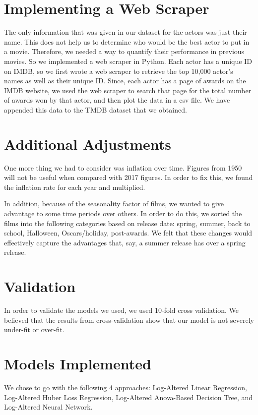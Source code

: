 \documentclass{article}
\begin{document}
\section*{Implementing a Web Scraper}
\vspace{0.2in}

The only information that was given in our dataset for the actors was just their name. This does not help us to determine who would be the best actor to put in a movie. Therefore, we needed a way to quantify their performance in previous movies. So we implemented a web scraper in Python. Each actor has a unique ID on IMDB, so we first wrote a web scraper to retrieve the top 10,000 actor’s names as well as their unique ID. Since, each actor has a page of awards on the IMDB website, we used the web scraper to search that page for the total number of awards won by that actor, and then plot the data in a csv file. We have appended this data to the TMDB dataset that we obtained. 

\section*{Additional Adjustments}
\vspace{0.2in}

One more thing we had to consider was inflation over time. Figures from 1950 will not be useful when compared with 2017 figures. In order to fix this, we found the inflation rate for each year and multiplied.

In addition, because of the seasonality factor of films, we wanted to give advantage to some time periods over others. In order to do this, we sorted the films into the following categories based on release date: spring, summer, back to school, Halloween, Oscars/holiday, post-awards. We felt that these changes would effectively capture the advantages that, say, a summer release has over a spring release.


\section*{Validation}
\vspace{0.2in}

In order to validate the models we used, we used 10-fold cross validation. We believed that the results from cross-validation show that our model is not severely under-fit or over-fit.

\section*{Models Implemented}
\vspace{0.2in}
We chose to go with the following 4 approaches: Log-Altered Linear Regression, Log-Altered Huber Loss Regression, Log-Altered Anova-Based Decision Tree, and Log-Altered Neural Network.
\end{document}
